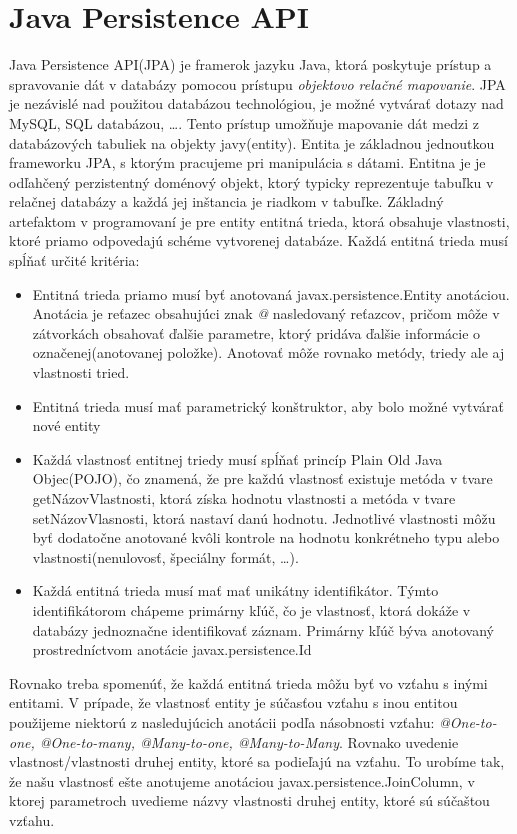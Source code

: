 \section{Java Persistence API}\label{jpakap}
Java Persistence API(JPA) je framerok jazyku Java, ktorá poskytuje prístup a spravovanie dát v databázy pomocou prístupu \emph{objektovo relačné mapovanie}. JPA je nezávislé nad použitou databázou technológiou, je možné vytvárať dotazy nad MySQL, SQL databázou, \ldots. Tento prístup  umožňuje mapovanie dát medzi  z databázových tabuliek na objekty javy(entity). Entita je základnou jednoutkou frameworku JPA, s ktorým pracujeme pri manipulácia s dátami. Entitna je je odľahčený perzistentný doménový objekt, ktorý typicky reprezentuje tabuľku v relačnej databázy a každá jej inštancia je riadkom v  tabuľke. Základný artefaktom v programovaní je pre entity entitná trieda, ktorá obsahuje vlastnosti, ktoré priamo odpovedajú schéme vytvorenej databáze. Každá entitná trieda musí spĺňať určité kritéria:
\begin{itemize}
\item Entitná trieda priamo musí byť anotovaná javax.persistence.Entity anotáciou. Anotácia je reťazec obsahujúci znak \emph{@} nasledovaný reťazcov, pričom môže v zátvorkách obsahovať ďalšie parametre, ktorý pridáva ďalšie informácie o označenej(anotovanej položke). Anotovať môže rovnako metódy, triedy ale aj vlastnosti tried.
\item Entitná trieda musí mať parametrický konštruktor, aby bolo možné vytvárať nové entity
\item Každá vlastnosť entitnej triedy musí spĺňať princíp Plain Old Java Objec(POJO), čo znamená, že pre každú vlastnosť existuje metóda v tvare getNázovVlastnosti, ktorá získa hodnotu vlastnosti a metóda v tvare setNázovVlasnosti, ktorá nastaví danú hodnotu. Jednotlivé vlastnosti môžu byť dodatočne anotované kvôli kontrole na hodnotu konkrétneho typu alebo vlastnosti(nenulovosť, špeciálny formát, \ldots).
\item Každá entitná trieda musí mať mať unikátny identifikátor. Týmto identifikátorom chápeme primárny kľúč, čo je vlastnosť, ktorá dokáže v databázy jednoznačne identifikovať záznam. Primárny kľúč býva anotovaný prostredníctvom anotácie javax.persistence.Id
\end{itemize}
\newline  \indent Rovnako treba spomenúť, že každá entitná trieda môžu byť vo vzťahu s inými entitami. V prípade, že vlastnosť entity je súčasťou vzťahu s inou entitou použijeme niektorú z nasledujúcich anotácii podľa násobnosti vzťahu: \emph{@One-to-one, @One-to-many, @Many-to-one, @Many-to-Many}. Rovnako uvedenie vlastnost/vlastnosti druhej entity, ktoré sa podieľajú na vzťahu. To urobíme tak, že našu vlastnosť ešte anotujeme anotáciou javax.persistence.JoinColumn, v ktorej parametroch uvedieme názvy vlastnosti druhej entity, ktoré sú súčaštou vzťahu.
